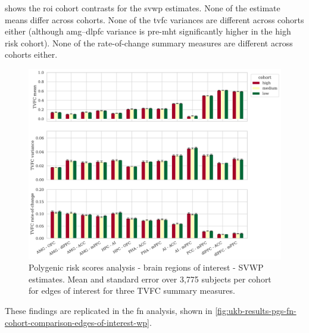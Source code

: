  shows the \gls{roi} cohort contrasts for the \gls{svwp} estimates.
None of the estimate means differ across cohorts.
None of the \gls{tvfc} variances are different across cohorts either (although \gls{amg}--\gls{dlpfc} variance is pre-\gls{mht} significantly higher in the high risk cohort).
None of the rate-of-change summary measures are different across cohorts either.


\begin{figure}[h]
  \centering
  \includegraphics[width=\textwidth]{fig/ukbiobank/TVFC_predictions_summaries/pgs/cohort_comparison/ROI/correlation_all_TVFC_summary_measures_SVWP_joint_edges_of_interest}
  \caption{
    Polygenic risk scores analysis - brain regions of interest - SVWP estimates.
    Mean and standard error over 3,775 subjects per cohort for edges of interest for three TVFC summary measures.
  }\label{fig:ukb-results-pgs-roi-cohort-comparison-edges-of-interest-wp}
\end{figure}


These findings are replicated in the \gls{fn} analysis, shown in \cref{fig:ukb-results-pgs-fn-cohort-comparison-edges-of-interest-wp}.


